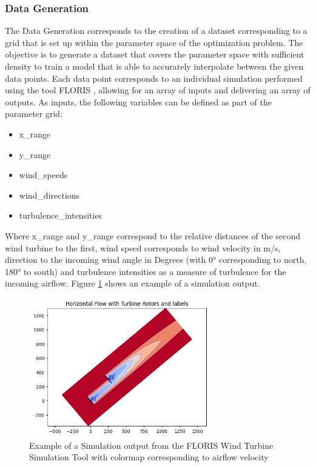 \subsubsection{Data Generation}

The Data Generation corresponds to the creation of a dataset corresponding to a grid that is set up within the parameter space of the optimization problem. The objective is to generate a dataset that covers the parameter space with sufficient density to train a model that is able to accurately interpolate between the given data points. Each data point corresponds to an individual simulation performed using the tool FLORIS \cite{nrel_floris_web}, allowing for an array of inputs and delivering an array of outputs. As inputs, the following variables can be defined as part of the parameter grid:

\begin{itemize}
	\item x\_range
	\item y\_range
	\item wind\_speeds
	\item wind\_directions
	\item turbulence\_intensities
\end{itemize}

Where x\_range and y\_range correspond to the relative distances of the second wind turbine to the first, wind speed corresponds to wind velocity in m/s,  direction to the incoming wind angle in Degrees (with 0° corresponding to north, 180° to south) and turbulence intensities as a measure of turbulence for the incoming airflow. Figure \ref{fig:Floris} shows an example of a simulation output. 


\begin{figure}[h] 
	\centering
	\includegraphics[width=0.7\textwidth]{../figures/modelling/Floris.png} 
	\caption{Example of a Simulation output from the FLORIS Wind Turbine Simulation Tool \cite{nrel_floris} with colormap corresponding to airflow velocity}
	\label{fig:Floris}
\end{figure}

